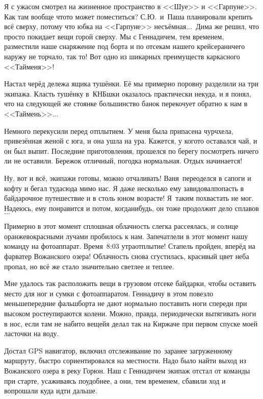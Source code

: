 Я с ужасом смотрел на жизненное пространство в <<Шуе>> и <<Гарпуне>>. Как там вообще что\sdash то может поместиться? С.Ю.~и~Паша планировали крепить всё сверху, потому что юбка на <<Гарпуне>> несъёмная$\ldots$~Дима же решил, что просто покидает вещи горой сверху. Мы с Геннадичем, тем временем, разместили наше снаряжение под борта и по отсекам нашего крейсера\mdash ничего наружу не торчало, так то! Вот одно из шикарных преимуществ каркасного <<Тайменя>>!

Настал черёд дележа ящика тушёнки. Её мы примерно поровну разделили на три экипажа. Класть тушёнку в~КНБ\sdash шки оказалось практически некуда, и я понял, что на следующей же стоянке большинство банок перекочует обратно к нам в <<Таймень>>$\ldots$

Немного перекусили перед отплытием. У меня была припасена чурчхела, привезённая женой с юга, и она ушла на ура. Кажется, у кого\sdash то оставался чай, и он был выпит. Последние приготовления, прошелся по берегу посмотреть ничего ли не оставили. Бережок отличный, погодка нормальная. Отдых начинается!

Ну, вот и всё, экипажи готовы, можно отчаливать! Ваня~переоделся в сапоги и кофту и бегал туда\sdash сюда мимо нас. Я даже несколько ему завидовал\mdash попасть в байдарочное путешествие и в столь юном возрасте! Я~таким похвастать не мог. Надеюсь, ему понравится и потом, когда\sdash нибудь, он тоже продолжит дело сплавов$\ldots$

Примерно в этот момент сплошная облачность слегка рассеялась, и солнце оранжево\sdash красными лучами пробилось к нам. Запечатлели в этот момент нашу команду на фотоаппарат. Время~8:03 утра\mdash отплытие! Стапель пройден, вперёд на фарватер Вожанского  озера! Облачность снова сгустилась, красивый цвет неба пропал, но всё же стало значительно светлее и теплее.

Мне удалось так расположить вещи в грузовом отсеке байдарки, чтобы оставить место для ног и сумки с фотоаппаратом. Геннадичу в этом повезло меньше\mdash передние фальшборта не дают нормально поставить ноги спереди при высоком росте\mdash упираются колени. Можно, правда, периодически вытягивать ноги в нос, если там не набито вещей\mdash я делал так на Киржаче при первом спуске моей ласточки на воду.  

Достал GPS навигатор, включил отслеживание по~заранее загруженному маршруту, быстро сориентировался на местности. Надо было найти выход из Вожанского озера в реку Горюн. Наш с Геннадичем экипаж отстал от команды при старте, усаживаясь поудобнее, а они, тем временем, сбавили ход и вопрошали куда идти дальше. 

